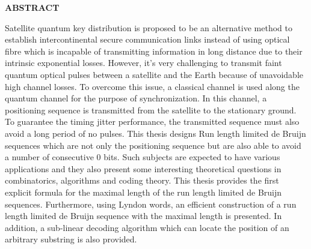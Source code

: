 \begin{center}
    \Large{\textbf{ABSTRACT}}\\
\end{center}
\vspace{1cm}
Satellite quantum key distribution is proposed to be an alternative method to establish intercontinental secure communication links instead of using optical fibre which is incapable of transmitting information in long distance due to their intrinsic exponential losses. However, it's very challenging to transmit faint quantum optical pulses between a satellite and the Earth because of unavoidable high channel losses. To overcome this issue, a classical channel is used along the quantum channel for the purpose of synchronization. In this channel, a positioning sequence is transmitted from the satellite to the stationary ground. To guarantee the timing jitter performance, the transmitted sequence must also avoid a long period of no pulses. This thesis designs Run length limited de Bruijn sequences which are not only the positioning sequence but are also able to avoid a number of consecutive $0$ bits. Such subjects are expected to have various applications and they also present some interesting theoretical questions in combinatorics, algorithms and coding theory. This thesis provides the first explicit formula for the maximal length of the run length limited de Bruijn sequences. Furthermore, using Lyndon words, an efficient construction of a run length limited de Bruijn sequence with the maximal length is presented. In addition, a sub-linear decoding algorithm which can locate the position of an arbitrary substring is also provided. 

		
